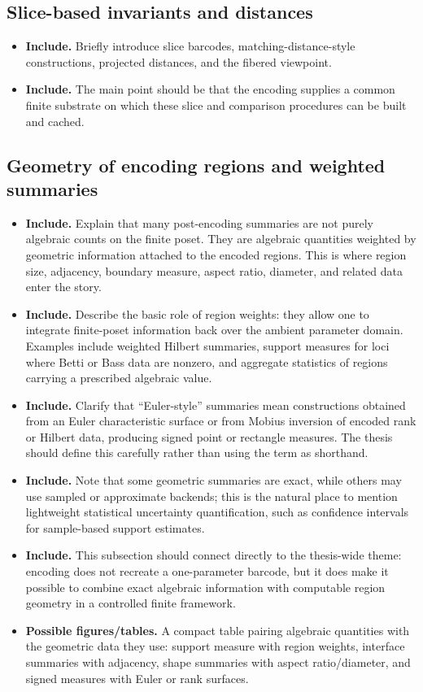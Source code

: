 \documentclass[11pt]{article}
\newenvironment{plan}{\begin{itemize}[leftmargin=1.6em,itemsep=0.35em,topsep=0.25em]}{\end{itemize}}
\newcommand{\includeitems}[1]{\item \textbf{Include.} #1}
\newcommand{\figures}[1]{\item \textbf{Possible figures/tables.} #1}
\begin{document}
\subsection{Slice-based invariants and distances}

\begin{plan}
    \includeitems{Briefly introduce slice barcodes, matching-distance-style constructions, projected distances, and the fibered viewpoint.}
    \includeitems{The main point should be that the encoding supplies a common finite substrate on which these slice and comparison procedures can be built and cached.}
\end{plan}



\subsection{Geometry of encoding regions and weighted summaries}

\begin{plan}
    \includeitems{Explain that many post-encoding summaries are not purely algebraic counts on the finite poset. They are algebraic quantities weighted by geometric information attached to the encoded regions. This is where region size, adjacency, boundary measure, aspect ratio, diameter, and related data enter the story.}
    \includeitems{Describe the basic role of region weights: they allow one to integrate finite-poset information back over the ambient parameter domain. Examples include weighted Hilbert summaries, support measures for loci where Betti or Bass data are nonzero, and aggregate statistics of regions carrying a prescribed algebraic value.}
    \includeitems{Clarify that ``Euler-style'' summaries mean constructions obtained from an Euler characteristic surface or from Mobius inversion of encoded rank or Hilbert data, producing signed point or rectangle measures. The thesis should define this carefully rather than using the term as shorthand.}
    \includeitems{Note that some geometric summaries are exact, while others may use sampled or approximate backends; this is the natural place to mention lightweight statistical uncertainty quantification, such as confidence intervals for sample-based support estimates.}
    \includeitems{This subsection should connect directly to the thesis-wide theme: encoding does not recreate a one-parameter barcode, but it does make it possible to combine exact algebraic information with computable region geometry in a controlled finite framework.}
    \figures{A compact table pairing algebraic quantities with the geometric data they use: support measure with region weights, interface summaries with adjacency, shape summaries with aspect ratio/diameter, and signed measures with Euler or rank surfaces.}
\end{plan}
\end{document}
